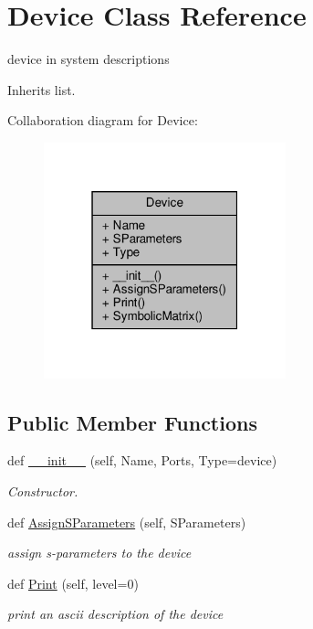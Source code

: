 \hypertarget{classSignalIntegrity_1_1SystemDescriptions_1_1Device_1_1Device}{}\section{Device Class Reference}
\label{classSignalIntegrity_1_1SystemDescriptions_1_1Device_1_1Device}


device in system descriptions  




Inherits list.



Collaboration diagram for Device\+:
\nopagebreak
\begin{figure}[H]
\begin{center}
\leavevmode
\includegraphics[width=199pt]{classSignalIntegrity_1_1SystemDescriptions_1_1Device_1_1Device__coll__graph}
\end{center}
\end{figure}
\subsection*{Public Member Functions}
\begin{DoxyCompactItemize}
\item 
def \hyperlink{classSignalIntegrity_1_1SystemDescriptions_1_1Device_1_1Device_aa13732b8be1d26511f983436259d282f}{\+\_\+\+\_\+init\+\_\+\+\_\+} (self, Name, Ports, Type=\textquotesingle{}device\textquotesingle{})
\begin{DoxyCompactList}\small\item\em Constructor. \end{DoxyCompactList}\item 
def \hyperlink{classSignalIntegrity_1_1SystemDescriptions_1_1Device_1_1Device_ac588a4be7e9067cb86aed0fc706f4902}{Assign\+S\+Parameters} (self, S\+Parameters)
\begin{DoxyCompactList}\small\item\em assign s-\/parameters to the device \end{DoxyCompactList}\item 
def \hyperlink{classSignalIntegrity_1_1SystemDescriptions_1_1Device_1_1Device_a891ce4dff358dfe4f73c3c0e269bcffd}{Print} (self, level=0)
\begin{DoxyCompactList}\small\item\em print an ascii description of the device \end{DoxyCompactList}\end{DoxyCompactItemize}

